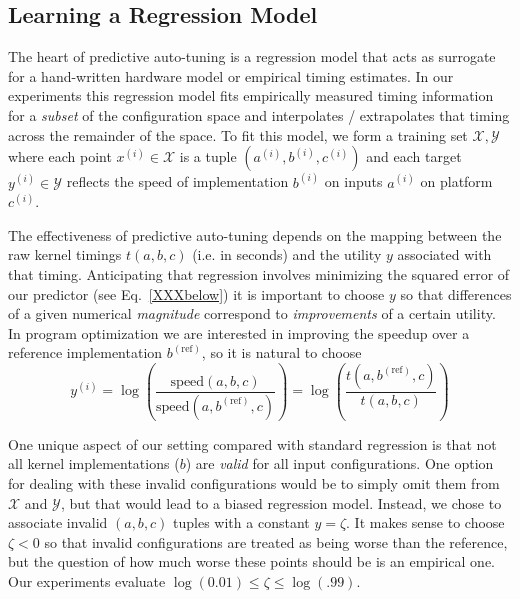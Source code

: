 \documentclass{sig-alternate}
\begin{document}
\subsection{Learning a Regression Model}

The heart of predictive auto-tuning is a regression model that acts as surrogate
for a hand-written hardware model or empirical timing estimates.
In our experiments this regression model fits empirically measured timing information for a {\em subset} of the configuration space and interpolates / extrapolates that timing across the remainder of the space.
To fit this model, we
form a training set $\mathcal{X}, \mathcal{Y}$ where
each point $x^{(i)} \in \mathcal{X}$ is a tuple $(a^{(i)}, b^{(i)}, c^{(i)})$
and each target $y^{(i)} \in \mathcal{Y}$  reflects the speed of implementation $b^{(i)}$
on inputs $a^{(i)}$ on platform $c^{(i)}$.

The effectiveness of predictive auto-tuning depends on the mapping between the raw kernel timings $t(a, b, c)$ (i.e. in seconds) and the utility $y$ associated with that timing.
Anticipating that regression involves minimizing the squared error of our predictor (see Eq.~\ref{XXXbelow}) it is important to choose $y$ so that differences of a given numerical {\em magnitude} correspond to {\em improvements} of a certain utility.
In program optimization we are interested in improving the speedup over a reference implementation $b^{(\mathrm{ref})}$, so it is natural to choose
\begin{equation}
y^{(i)}
= \log\left(\frac{\mathrm{speed}(a, b, c)}{\mathrm{speed}(a, b^{(\mathrm{ref})}, c)} \right)
= \log\left(\frac{t(a, b^{(\mathrm{ref})}, c)}{t(a, b, c)} \right)
\end{equation}

One unique aspect of our setting compared with standard regression
is that not all kernel implementations ($b$) are {\em valid}
for all input configurations. One option for dealing with these invalid configurations
would be to simply omit them from $\mathcal{X}$ and $\mathcal{Y}$, but that would lead to a biased regression model.
Instead, we chose to associate invalid $(a, b, c)$ tuples with a constant $y = \zeta$.
It makes sense to choose $\zeta < 0$ so that invalid configurations are treated as being worse than the reference,
but the question of how much worse these points should be is an empirical one.
Our experiments evaluate $\log(0.01) \leq \zeta \leq \log(.99)$.

\end{document}

